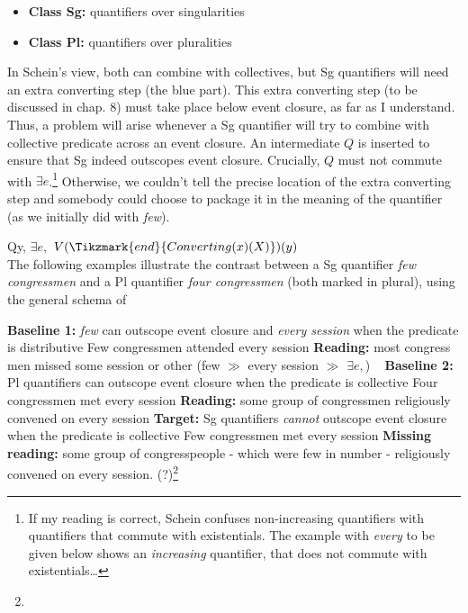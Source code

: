 \begin{itemize}
\item \textbf{Class Sg:} quantifiers over singularities 
\item \textbf{Class Pl:} quantifiers over pluralities
\end{itemize}
%
In Schein's view, both can combine with collectives, but Sg quantifiers will need an extra converting step (the blue part). This extra converting step (to be discussed in chap. 8) must take place below event closure, as far as I understand. Thus, a problem will arise whenever a Sg quantifier will try to combine with collective predicate across an event closure. An intermediate $Q$ is inserted to ensure that Sg indeed outscopes event closure. Crucially, $Q$ must not commute with $\exists e$.\footnote{If my reading is correct, Schein confuses non-increasing quantifiers with quantifiers that commute with existentials. The example with \emph{every} to be given below shows an \emph{increasing} quantifier, that does not commute with existentials\ldots} Otherwise, we couldn't tell the precise location of the extra converting step and somebody could choose to package it in the meaning of the quantifier (as we initially did with \emph{few}).

\ex
{}\hspace{1.5ex} Qy,\hspace{1.5ex} $\exists e,$\hspace{1.5ex} $V(\Tikzmark{end}{Converting(x)(X)})(y)$\\
\xe
%
The following examples illustrate the contrast between a Sg quantifier \emph{few congressmen} and a Pl quantifier \emph{four congressmen} (both marked in plural), using the general schema of \clastx

\pex \textbf{Baseline 1:} \emph{few} can outscope event closure and \emph{every session} when the predicate is distributive
\a Few congressmen attended every session
\a \textbf{Reading:} most congress men missed some session or other (few $\gg$ every session $\gg$ $\exists e,$)
\xe
%
\pex~ \textbf{Baseline 2:} Pl quantifiers can outscope event closure when the predicate is collective
\a Four congressmen met every session
\a \textbf{Reading:} some group of congressmen religiously convened on every session
\xe
%
\pex \textbf{Target:} Sg quantifiers \emph{cannot} outscope event closure when the predicate is collective
\a Few congressmen met every session
\a \textbf{Missing reading:} some group of congresspeople - which were few in number - religiously convened on every session. (?)\footnote{}
\xe
%


